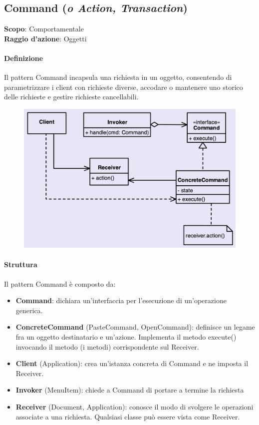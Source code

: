 \subsection{Command (\textit{o Action, Transaction})}
\label{command}

\textbf{Scopo}: Comportamentale \\
\textbf{Raggio d'azione}: Oggetti

\paragraph{Definizione} Il pattern Command incapsula una richiesta in un oggetto, consentendo di parametrizzare i client con richieste diverse, accodare o mantenere uno storico delle richieste e gestire richieste cancellabili.

\begin{figure}[H]
    \centering
    \includegraphics[width=1\linewidth]{assets/pattern/command/command-struttura.png}
\end{figure}

\paragraph{Struttura} Il pattern Command è composto da:
\begin{itemize}
    \item \textbf{Command}: dichiara un’interfaccia per l’esecuzione di un’operazione generica. 
    \item \textbf{ConcreteCommand} (PasteCommand, OpenCommand): definisce un legame fra un oggetto destinatario e un’azione. Implementa il metodo execute() invocando il metodo (i metodi) corrispondente sul Receiver. 
    \item \textbf{Client} (Application): crea un’istanza concreta di Command e ne imposta il Receiver. 
    \item \textbf{Invoker} (MenuItem): chiede a Command di portare a termine la richiesta 
    \item \textbf{Receiver} (Document, Application): conosce il modo di svolgere le operazioni associate a una richiesta. Qualsiasi classe può essere vista come Receiver.
\end{itemize}

